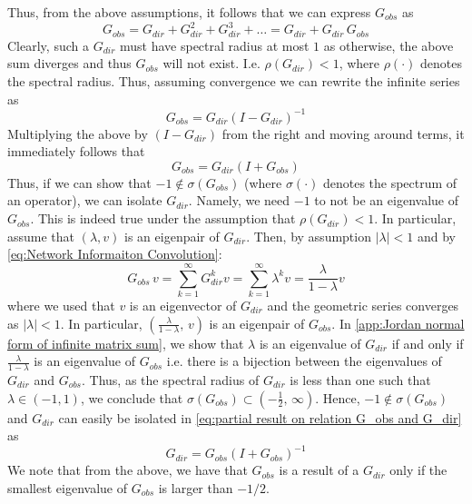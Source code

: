 \documentclass[../Thesis.tex]{subfiles}
\begin{document}
Thus, from the above assumptions, it follows that we can express $G_{obs}$ as
\begin{equation}\label{eq:Network Informaiton Convolution}
    G_{obs} = G_{dir} + G_{dir}^2 + G_{dir}^3 + \dots = G_{dir} + G_{dir} \, G_{obs}
\end{equation}
Clearly, such a $G_{dir}$ must have spectral radius at most $1$ as otherwise, the above sum diverges and thus $G_{obs}$ will not exist. I.e. $\rho\left(G_{dir}\right) < 1$, where $\rho\left(\cdot\right)$ denotes the spectral radius. Thus, assuming convergence we can rewrite the infinite series as
\begin{equation}\label{eq:Gobs from Gdir}
    G_{obs} = G_{dir} \left(I - G_{dir}\right)^{-1}
\end{equation}
Multiplying the above by $\left(I - G_{dir}\right)$ from the right and moving around terms, it immediately follows that
\begin{equation}\label{eq:partial result on relation G_obs and G_dir}
    G_{obs} = G_{dir}\left(I + G_{obs}\right)
\end{equation}
Thus, if we can show that $-1 \not\in \sigma\left(G_{obs}\right)$ (where $\sigma \left(\cdot\right)$ denotes the spectrum of an operator), we can isolate $G_{dir}$. Namely, we need $-1$ to not be an eigenvalue of $G_{obs}$. This is indeed true under the assumption that $\rho\left(G_{dir}\right) < 1$. In particular, assume that $(\lambda, v)$ is an eigenpair of $G_{dir}$. Then, by assumption $\left|\lambda\right| < 1$ and by \autoref{eq:Network Informaiton Convolution}:
$$G_{obs}\, v = \sum_{k=1}^\infty G_{dir}^k v = \sum_{k=1}^\infty \lambda^k v = \frac{\lambda}{1-\lambda} v$$
where we used that $v$ is an eigenvector of $G_{dir}$ and the geometric series converges as $\left|\lambda\right| < 1$. In particular, $\left(\frac{\lambda}{ 1 - \lambda},\, v\right)$ is an eigenpair of $G_{obs}$. In \autoref{app:Jordan normal form of infinite matrix sum}, we show that $\lambda$ is an eigenvalue of $G_{dir}$ if and only if $\frac{\lambda}{1 - \lambda}$ is an eigenvalue of $G_{obs}$ i.e. there is a bijection between the eigenvalues of $G_{dir}$ and $G_{obs}$. Thus, as the spectral radius of $G_{dir}$ is less than one such that $\lambda \in (-1,1)$, we conclude that $\sigma\left(G_{obs}\right) \subset \left(-\frac{1}{2},\, \infty\right)$. Hence, $-1 \not\in \sigma \left(G_{obs}\right)$ and $G_{dir}$ can easily be isolated in \autoref{eq:partial result on relation G_obs and G_dir} as 
\begin{equation}\label{eq:Gdir from Gobs}
    G_{dir} = G_{obs} \left(I + G_{obs}\right)^{-1}
\end{equation}
We note that from the above, we have that $G_{obs}$ is a result of a $G_{dir}$ only if the smallest eigenvalue of $G_{obs}$ is larger than $-1/2$.
\end{document}
